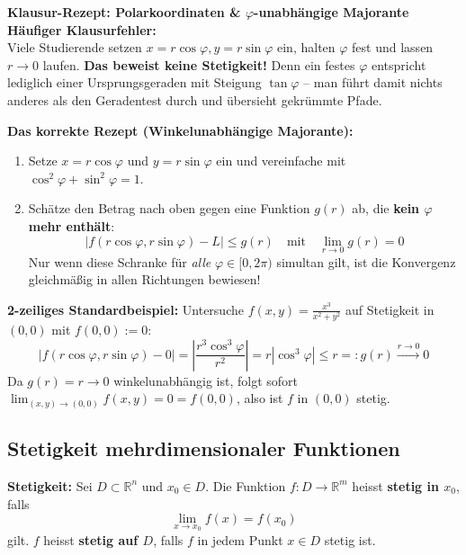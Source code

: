 \begin{remark}
    \textbf{Klausur-Rezept: Polarkoordinaten \& $\varphi$-unabhängige Majorante} \\
    \textbf{Häufiger Klausurfehler:} \\
    Viele Studierende setzen $x = r\cos\varphi, y = r\sin\varphi$ ein, halten $\varphi$ fest und lassen $r \to 0$ laufen. \textbf{Das beweist keine Stetigkeit!} Denn ein festes $\varphi$ entspricht lediglich einer Ursprungsgeraden mit Steigung $\tan\varphi$ – man führt damit nichts anderes als den Geradentest durch und übersieht gekrümmte Pfade.

    \textbf{Das korrekte Rezept (Winkelunabhängige Majorante):}
    \begin{enumerate}
        \item Setze $x = r \cos\varphi$ und $y = r \sin\varphi$ ein und vereinfache mit $\cos^2\varphi + \sin^2\varphi = 1$.
        \item Schätze den Betrag nach oben gegen eine Funktion $g(r)$ ab, die \textbf{kein $\varphi$ mehr enthält}:
        $$ |f(r\cos\varphi, r\sin\varphi) - L| \le g(r) \quad \text{mit} \quad \lim_{r \to 0} g(r) = 0 $$
        Nur wenn diese Schranke für \textit{alle} $\varphi \in [0, 2\pi)$ simultan gilt, ist die Konvergenz gleichmäßig in allen Richtungen bewiesen!
    \end{enumerate}

    \textbf{2-zeiliges Standardbeispiel:} Untersuche $f(x, y) = \frac{x^3}{x^2 + y^2}$ auf Stetigkeit in $(0, 0)$ mit $f(0, 0) := 0$:
    $$ |f(r\cos\varphi, r\sin\varphi) - 0| = \left| \frac{r^3 \cos^3\varphi}{r^2} \right| = r |\cos^3\varphi| \le r =: g(r) \xrightarrow{r \to 0} 0 $$
    Da $g(r) = r \to 0$ winkelunabhängig ist, folgt sofort $\lim_{(x,y)\to(0,0)} f(x, y) = 0 = f(0,0)$, also ist $f$ in $(0, 0)$ stetig.
\end{remark}

\subsection{Stetigkeit mehrdimensionaler Funktionen}

\begin{definition}
    \textbf{Stetigkeit:} Sei $D \subset \mathbb{R}^n$ und $x_0 \in D$. Die Funktion $f: D \to \mathbb{R}^m$ heisst \textbf{stetig in $x_0$}, falls
    $$ \lim_{x \to x_0} f(x) = f(x_0) $$
    gilt. $f$ heisst \textbf{stetig auf $D$}, falls $f$ in jedem Punkt $x \in D$ stetig ist.
\end{definition}

